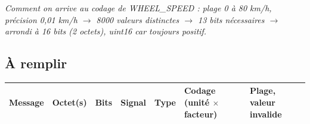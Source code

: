 \documentclass[10pt,a4paper]{article}
\let\oldsubsection\subsection
\renewcommand{\subsection}{\Needspace*{8\baselineskip}\oldsubsection}
\begin{document}
\begin{Form}
\noindent\footnotesize\textit{Comment on arrive au codage de WHEEL\_SPEED : plage 0 à 80 km/h, précision 0,01 km/h
$\rightarrow$ 8000 valeurs distinctes $\rightarrow$ 13 bits nécessaires $\rightarrow$ arrondi à 16 bits (2 octets), uint16 car toujours positif.}
\normalsize

\clearpage
\subsection*{À remplir}
\begin{longtable}{L{3.2cm} C{1.7cm} C{1.4cm} L{4.2cm} L{2.0cm} L{3.6cm} L{5.4cm}}
  \toprule
  \textbf{Message} & \textbf{Octet(s)} & \textbf{Bits} & \textbf{Signal} & \textbf{Type} & \textbf{Codage (unité $\times$ facteur)} & \textbf{Plage, valeur invalide} \\
  \midrule
  \endhead


\end{longtable}
\end{Form}
\end{document}
